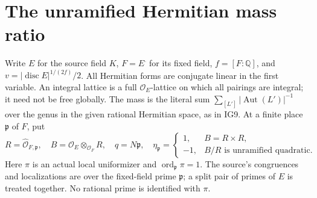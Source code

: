 \section{The unramified Hermitian mass ratio}
\label{sec:mass-formula}


Write \(E\) for the source field \(K\), \(F=E^{\bar{\ }}\) for its
fixed field, \(f=[F:\mathbb Q]\), and
\(v=|\operatorname{disc}E|^{1/(2f)}/2\).
All Hermitian forms are conjugate linear in the first variable.
An integral lattice is a full \(\mathcal O_E\)-lattice on which
all pairings are integral; it need not be free globally. The mass is
the literal sum \(\sum_{[L']}|\operatorname{Aut}(L')|^{-1}\) over the
genus in the given rational Hermitian space, as in IG9.
At a finite place \(\mathfrak p\) of \(F\), put
\[
 R=\widehat{\mathcal O}_{F,\mathfrak p},\quad
 B=\mathcal O_E\otimes_{\mathcal O_F}R,\quad
 q=N\mathfrak p,\quad \eta_{\mathfrak p}=
 \begin{cases}1,&B=R\times R,\\-1,&B/R\text{ is unramified quadratic}.
 \end{cases}
\]
Here \(\pi\) is an actual local uniformizer and
\(\operatorname{ord}_{\mathfrak p}\pi=1\).
The source's congruences and localizations are over the fixed-field
prime \(\mathfrak p\); a split pair of primes of \(E\) is treated
together. No rational prime is identified with \(\pi\).

